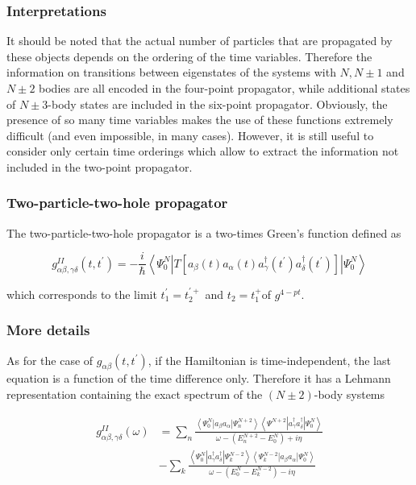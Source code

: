 \documentclass[compress]{beamer}
\begin{document}
\frame
{
\frametitle{Interpretations}
\begin{small}
{\scriptsize
It should be noted that the actual number of particles that are
propagated by these objects depends on the ordering of the time
variables. Therefore the information on transitions between
eigenstates of the systems with $N, N \pm 1$ and $N \pm 2$ bodies are
all encoded in the four-point propagator, while additional states of $N \pm 3$-body
states are included in the six-point propagator. Obviously, the presence of so many
time variables makes the use of these functions extremely difficult
(and even impossible, in many cases). However, it is still useful to
consider only certain time orderings which allow to extract the
information not included in the two-point propagator.

}
\end{small}
}
\frame
{
\frametitle{Two-particle-two-hole propagator}
\begin{small}
{\scriptsize
The two-particle-two-hole propagator is a two-times Green's function
defined as

$$
g_{\alpha \beta, \gamma \delta}^{I I}\left(t, t^{\prime}\right)=-\frac{i}{\hbar}\left\langle\Psi_{0}^{N}\left|T\left[a_{\beta}(t) a_{\alpha}(t) a_{\gamma}^{\dagger}\left(t^{\prime}\right) a_{\delta}^{\dagger}\left(t^{\prime}\right)\right]\right| \Psi_{0}^{N}\right\rangle
$$

which corresponds to the limit $t_{1}^{\prime}=t_{2}^{\prime+}$ and $t_{2}=t_{1}^{+}$of $g^{4-p t}$.

}
\end{small}
}
\frame
{
\frametitle{More details}
\begin{small}
{\scriptsize
As for the case of $g_{\alpha \beta}\left(t, t^{\prime}\right)$, if
the Hamiltonian is time-independent, the last equation is a function of the
time difference only. Therefore it has a Lehmann representation
containing the exact spectrum of the $(N \pm 2)$-body systems

$$
\begin{aligned}
g_{\alpha \beta, \gamma \delta}^{I I}(\omega) & =\sum_{n} \frac{\left\langle\Psi_{0}^{N}\left|a_{\beta} a_{\alpha}\right| \Psi_{n}^{N+2}\right\rangle\left\langle\Psi^{N+2}\left|a_{\gamma}^{\dagger} a_{\delta}^{\dagger}\right| \Psi_{0}^{N}\right\rangle}{\omega-\left(E_{n}^{N+2}-E_{0}^{N}\right)+i \eta} \\
& -\sum_{k} \frac{\left\langle\Psi_{0}^{N}\left|a_{\gamma}^{\dagger} a_{\delta}^{\dagger}\right| \Psi_{k}^{N-2}\right\rangle\left\langle\Psi_{k}^{N-2}\left|a_{\beta} a_{\alpha}\right| \Psi_{0}^{N}\right\rangle}{\omega-\left(E_{0}^{N}-E_{k}^{N-2}\right)-i \eta}
\end{aligned}
$$

}
\end{small}
}
\end{document}
